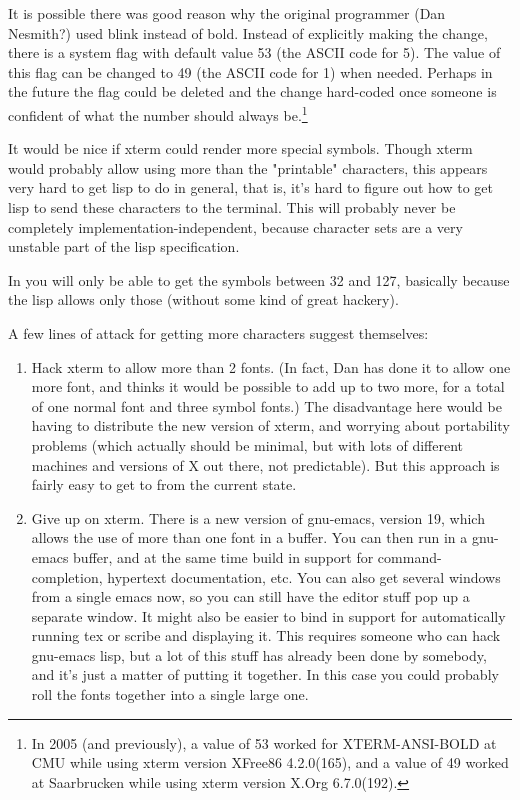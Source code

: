 It is possible there was good reason why the original programmer (Dan Nesmith?)
used blink instead of bold.  Instead of explicitly making the change,
there is a system flag  with default value
53 (the ASCII code for 5).  The value of this flag can be changed to
49 (the ASCII code for 1) when needed.  Perhaps in the future
the flag could be deleted and the change hard-coded once someone
is confident of what the number should always be.\footnote{In 2005 (and previously), 
a value of 53 worked for XTERM-ANSI-BOLD at
CMU while using xterm version XFree86 4.2.0(165), and a value of 49
worked at Saarbrucken while using xterm version X.Org 6.7.0(192).}

It would be nice if xterm could render more special symbols.
Though xterm would probably allow using
more than the "printable" characters, this appears very hard to get
lisp to do in general, that is, it's hard to figure out how to get lisp to
send these characters to the terminal.  This will probably never be
completely implementation-independent, because character sets are a very
unstable part of the lisp specification.

In \TPS you will only be able to get the symbols between 32 and 127, basically
because the lisp allows only those (without some kind of great hackery).

A few lines of attack for getting more characters suggest themselves:

\begin{enumerate}
\item Hack xterm to allow more than 2 fonts. (In fact, Dan has
done it to allow one more font, and thinks it would be possible to add up
to two more, for a total of one normal font and three symbol fonts.)
The disadvantage here would be having to distribute the new version of xterm,
and worrying about portability problems (which actually should be minimal,
but with lots of different machines and versions of X out there, not
predictable).  But this approach is fairly easy to get to from the current
state.

\item Give up on xterm.  There is a new version of gnu-emacs, version 19,
which allows the use of more than one font in a buffer.  You can then run
\TPS in a gnu-emacs buffer, and at the same time build in support for
command-completion, hypertext documentation, etc.  You can also get several
windows from a single emacs now, so you can still have the editor stuff
pop up a separate window.  It might also be easier to bind in support
for automatically running tex or scribe and displaying it.
This requires someone who can hack gnu-emacs lisp, but a lot of this
stuff has already been done by somebody, and it's just a matter of putting
it together.   In this case you could probably roll the fonts together into
a single large one.
\end{enumerate}
